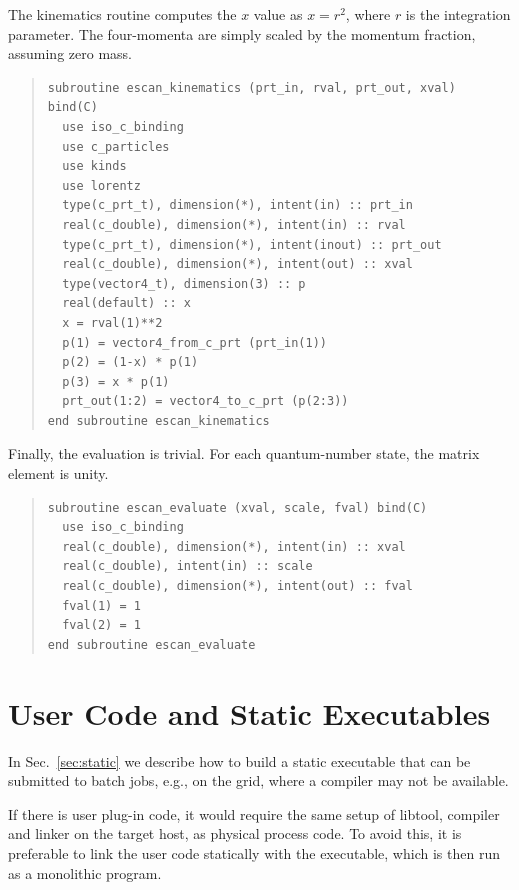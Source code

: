 \documentclass[12pt]{book}
\begin{document}
The kinematics routine computes the $x$ value as $x=r^2$, where $r$ is
the integration parameter.  The four-momenta are simply scaled by the
momentum fraction, assuming zero mass.
\begin{quote}
  \begin{footnotesize}
\begin{verbatim}
subroutine escan_kinematics (prt_in, rval, prt_out, xval) bind(C)
  use iso_c_binding
  use c_particles
  use kinds
  use lorentz
  type(c_prt_t), dimension(*), intent(in) :: prt_in
  real(c_double), dimension(*), intent(in) :: rval
  type(c_prt_t), dimension(*), intent(inout) :: prt_out
  real(c_double), dimension(*), intent(out) :: xval
  type(vector4_t), dimension(3) :: p
  real(default) :: x
  x = rval(1)**2
  p(1) = vector4_from_c_prt (prt_in(1))
  p(2) = (1-x) * p(1)
  p(3) = x * p(1)
  prt_out(1:2) = vector4_to_c_prt (p(2:3))
end subroutine escan_kinematics
\end{verbatim}
  \end{footnotesize}
\end{quote}
Finally, the evaluation is trivial.  For each quantum-number state,
the matrix element is unity.
\begin{quote}
  \begin{footnotesize}
\begin{verbatim}
subroutine escan_evaluate (xval, scale, fval) bind(C)
  use iso_c_binding
  real(c_double), dimension(*), intent(in) :: xval
  real(c_double), intent(in) :: scale
  real(c_double), dimension(*), intent(out) :: fval
  fval(1) = 1
  fval(2) = 1
end subroutine escan_evaluate
\end{verbatim}
  \end{footnotesize}
\end{quote}

\section{User Code and Static Executables}

In Sec.~\ref{sec:static} we describe how to build a static executable that can
be submitted to batch jobs, e.g., on the grid, where a compiler may not be
available.

If there is user plug-in code, it would require the same setup of
libtool, compiler and linker on the target host, as physical process
code.  To avoid this, it is preferable to link the user code
statically with the executable, which is then run as a monolithic
program.
\end{document}
